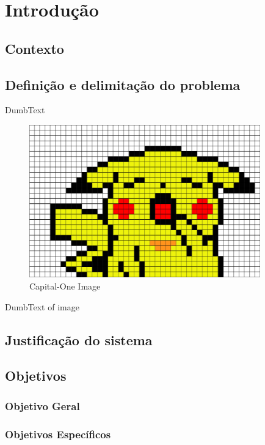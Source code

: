 
\chapter{Introdução}
    \section{Contexto}
        \blindtext[2]
        
    \section{Definição e delimitação do problema}
        DumbText
        
        \begin{figure}[h]
            \centering
            \includegraphics[width=10cm]{images/pixelart-artist2.png}
            \caption{Capital-One Image}
            \label{fig:capital-onel}
        \end{figure}
        
        DumbText of image

    \section{Justificação do sistema}
    
    \section{Objetivos}
        \subsection{Objetivo Geral}
        \blindtext[1]

        \subsection{Objetivos Específicos}
        \blindtext[1]